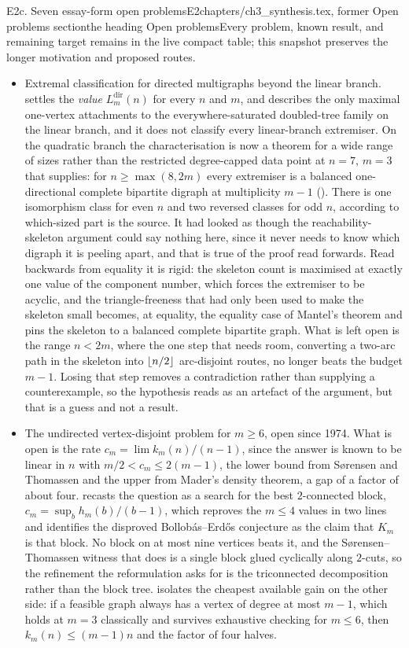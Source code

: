 \begin{offcut}{E2c. Seven essay-form open problems}{E2}{chapters/ch3\_synthesis.tex, former Open problems section}{the heading Open problems}{Every problem, known result, and remaining target remains in the live compact table; this snapshot preserves the longer motivation and proposed routes.}
\begin{itemize}
    \item Extremal classification for directed multigraphs beyond the linear branch.  settles the \emph{value} $L_m^{\mathrm{dir}}(n)$ for every $n$ and $m$, and  describes the only maximal one-vertex attachments to the everywhere-saturated doubled-tree family on the linear branch, and it does not classify every linear-branch extremiser. On the quadratic branch the characterisation is now a theorem for a wide range of sizes rather than the restricted degree-capped data point at $n = 7$, $m = 3$ that  supplies: for $n \ge \max(8, 2m)$ every extremiser is a balanced one-directional complete bipartite digraph at multiplicity $m-1$ (). There is one isomorphism class for even $n$ and two reversed classes for odd $n$, according to which-sized part is the source. It had looked as though the reachability-skeleton argument could say nothing here, since it never needs to know which digraph it is peeling apart, and that is true of the proof read forwards. Read backwards from equality it is rigid: the skeleton count is maximised at exactly one value of the component number, which forces the extremiser to be acyclic, and the triangle-freeness that had only been used to make the skeleton small becomes, at equality, the equality case of Mantel's theorem and pins the skeleton to a balanced complete bipartite graph. What is left open is the range $n < 2m$, where the one step that needs room, converting a two-arc path in the skeleton into $\left\lfloor n/2 \right\rfloor$ arc-disjoint routes, no longer beats the budget $m-1$. Losing that step removes a contradiction rather than supplying a counterexample, so the hypothesis reads as an artefact of the argument, but that is a guess and not a result.
    \item The undirected vertex-disjoint problem for $m \ge 6$, open since 1974. What is open is the rate $c_m = \lim k_m(n)/(n-1)$, since the answer is known to be linear in $n$ with $m/2 < c_m \le 2(m-1)$, the lower bound from S{\o}rensen and Thomassen and the upper from Mader's density theorem, a gap of a factor of about four.  recasts the question as a search for the best $2$-connected block, $c_m = \sup_b h_m(b)/(b-1)$, which reproves the $m \le 4$ values in two lines and identifies the disproved Bollob\'{a}s--Erd\H{o}s conjecture as the claim that $K_m$ is that block. No block on at most nine vertices beats it, and the S{\o}rensen--Thomassen witness that does is a single block glued cyclically along $2$-cuts, so the refinement the reformulation asks for is the triconnected decomposition rather than the block tree.  isolates the cheapest available gain on the other side: if a feasible graph always has a vertex of degree at most $m-1$, which holds at $m = 3$ classically and survives exhaustive checking for $m \le 6$, then $k_m(n) \le (m-1)n$ and the factor of four halves.

\end{itemize}
\end{offcut}
